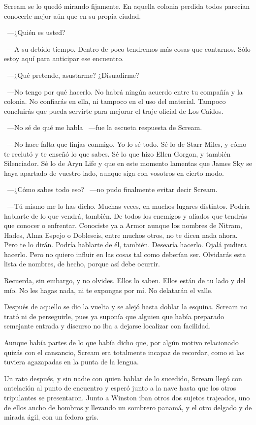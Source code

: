 Scream se lo quedó mirando fijamente. En aquella colonia perdida todos parecían conocerle mejor aún que en su propia ciudad.

~---¿Quién es usted?

~---A su debido tiempo. Dentro de poco tendremos más cosas que contarnos. Sólo estoy aquí para anticipar ese encuentro.

~---¿Qué pretende, asustarme? ¿Disuadirme?

~---No tengo por qué hacerlo. No habrá ningún acuerdo entre tu compañía y la colonia. No confiarás en ella, ni tampoco en el uso del material. Tampoco concluirás que pueda servirte para mejorar el traje oficial de Los Caídos.

~---No sé de qué me habla ~---fue la escueta respuesta de Scream.

~---No hace falta que finjas conmigo. Yo lo sé todo. Sé lo de Starr Miles, y cómo te reclutó y te enseñó lo que sabes. Sé lo que hizo Ellen Gorgon, y también Silenciador. Sé lo de Aryn Life y que en este momento lamentas que James Sky se haya apartado de vuestro lado, aunque siga con vosotros en cierto modo.

~---¿Cómo sabes todo eso? ~---no pudo finalmente evitar decir Scream.

~---Tú mismo me lo has dicho. Muchas veces, en muchos lugares distintos. Podría hablarte de lo que vendrá, también. De todos los enemigos y aliados que tendrás que conocer o enfrentar. Conociste ya a Armor aunque los nombres de Nitram, Hades, Alma Espejo o Dobleseis, entre muchos otros, no te dicen nada ahora. Pero te lo dirán. Podría hablarte de él, también. Desearía hacerlo. Ojalá pudiera hacerlo. Pero no quiero influir en las cosas tal como deberían ser. Olvidarás esta lista de nombres, de hecho, porque así debe ocurrir.

\rquoti Recuerda, sin embargo, y no olvides. Ellos lo saben. Ellos están de tu lado y del mío. No les hagas nada, ni te expongas por mí. No delatarán el valle.

Después de aquello se dio la vuelta y se alejó hasta doblar la esquina. Scream no trató ni de perseguirle, pues ya suponía que alguien que había preparado semejante entrada y discurso no iba a dejarse localizar con facilidad.

Aunque había partes de lo que había dicho que, por algún motivo relacionado quizás con el cansancio, Scream era totalmente incapaz de recordar, como si las tuviera agazapadas en la punta de la lengua.

\bigskip\noindent
Un rato después, y sin nadie con quien hablar de lo sucedido, Scream llegó con antelación al punto de encuentro y esperó junto a la nave hasta que los otros tripulantes se presentaron. Junto a Winston iban otros dos sujetos trajeados, uno de ellos ancho de hombros y llevando un sombrero panamá, y el otro delgado y de mirada ágil, con un fedora gris.

